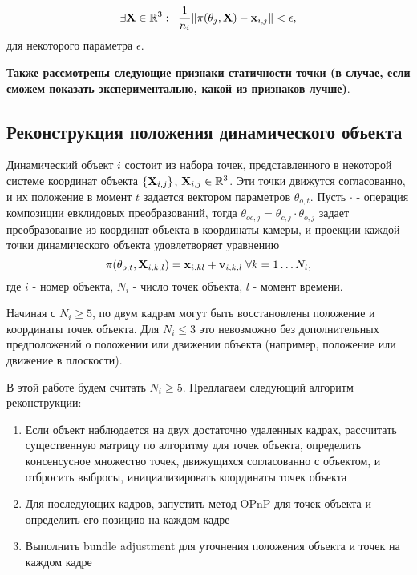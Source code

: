 \documentclass[conference]{IEEEtran}
\begin{document}
\begin{equation}\label{eq:stat_cond}
\exists {\bf X} \in \mathbb{R}^3: \; \; \frac{1}{n_i} \|\pi(\theta_j, {\bf X}) - {\bf x}_{i,j} \| < \epsilon,
\end{equation}
для некоторого параметра $\epsilon$.

{\bf Также рассмотрены следующие признаки статичности точки (в случае, если сможем показать экспериментально, какой из признаков лучше)}.

\subsection{Реконструкция положения динамического объекта}
Динамический объект $i$ состоит из набора точек, представленного в некоторой системе координат объекта $\{{\bf X}_{i,j} \} $, ${\bf X}_{i,j} \in \mathbb{R}^3$. Эти точки движутся согласованно, и их положение в момент $t$ задается вектором параметров $\theta_{o,t}$. Пусть $\cdot$ - операция композиции евклидовых преобразований, тогда $\theta_{oc, j} = \theta_{c,j} \cdot \theta_{o,j}$ задает преобразование из координат объекта в координаты камеры, и проекции каждой точки динамического объекта удовлетворяет уравнению 
\begin{equation}
\label{eq:dyn}
\pi(\theta_{o,t}, {\bf X}_{i,k,l}) = {\bf x}_{i,kl} + {\bf v}_{i,k,l} \; \forall k = 1 \ldots N_i,
\end{equation}
где $i$ - номер объекта, $N_i$ - число точек объекта, $l$ - момент времени.

Начиная с $N_i \geq 5$, по двум кадрам могут быть восстановлены положение и координаты точек объекта. Для $N_i \leq 3$ это невозможно без дополнительных предположений о положении или движении объекта (например, положение или движение в плоскости).

В этой работе будем считать $N_i \geq 5$. Предлагаем следующий алгоритм реконструкции:
\begin{enumerate}
\item Если объект наблюдается на двух достаточно удаленных кадрах, рассчитать существенную матрицу по алгоритму \cite{} для точек объекта, определить консенсусное множество точек, движущихся согласованно с объектом, и отбросить выбросы, инициализировать координаты точек объекта
\item Для последующих кадров, запустить метод OPnP для точек объекта и определить его позицию на каждом кадре
\item Выполнить bundle adjustment для уточнения положения объекта и точек на каждом кадре
\end{enumerate}
\end{document}
